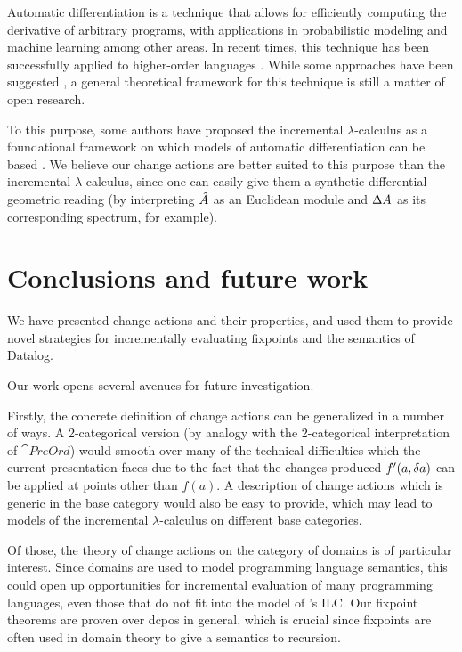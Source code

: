 Automatic differentiation \autocite{griewank2008evaluating} is a technique that allows
for efficiently computing the derivative of arbitrary programs, with
applications in probabilistic modeling \autocite{kucukelbir2017automatic}
and machine learning \autocite{baydin2014automatic} among other areas. In recent times, this technique has been successfully
applied to higher-order languages \autocites{siskind2008nesting}{baydin2016diffsharp}.
While some approaches have been suggested \autocites{manzyuk2012simply}{kelly2016evolving}, a general
theoretical framework for this technique is still a matter of open research. 

To this purpose, some authors have proposed the incremental $\lambda$-calculus
as a foundational framework on which models of automatic differentiation can
be based \autocite{kelly2016evolving}. We believe our change actions are better suited
to this purpose than the incremental $\lambda$-calculus, since one can easily give them a
synthetic differential geometric reading (by interpreting $\hat{A}$ as an Euclidean module and $\Delta A$
as its corresponding spectrum, for example).

\section{Conclusions and future work}

We have presented change actions and their properties, and used them to provide novel
strategies for incrementally evaluating fixpoints and the semantics of Datalog.

Our work opens several avenues for future investigation.

Firstly, the concrete definition of change actions can be generalized in a number of
ways. A 2-categorical version (by analogy with the 2-categorical interpretation
of $\cat{PreOrd}$) would smooth over many of the technical difficulties which
the current presentation faces due to the fact that the changes produced
$f'(a, \delta a)$ can be applied at points other than $f(a)$.
A description of change actions which is generic in
the base category would also be easy to provide, which may lead to models of
the incremental $\lambda$-calculus on different base categories. 

Of those, the theory of change actions on the category of domains is of particular interest. Since
domains are used to model programming language semantics, this could
open up opportunities for incremental evaluation of many programming languages,
even those that do not fit into the model of \citeauthor{cai2014changes}'s ILC.
Our fixpoint theorems are proven over dcpos in general, which is crucial since
fixpoints are often used in domain theory to give a semantics to recursion.

